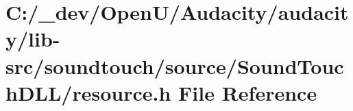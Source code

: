 \hypertarget{lib-src_2soundtouch_2source_2_sound_touch_d_l_l_2resource_8h}{}\section{C\+:/\+\_\+dev/\+Open\+U/\+Audacity/audacity/lib-\/src/soundtouch/source/\+Sound\+Touch\+D\+L\+L/resource.h File Reference}
\label{lib-src_2soundtouch_2source_2_sound_touch_d_l_l_2resource_8h}
